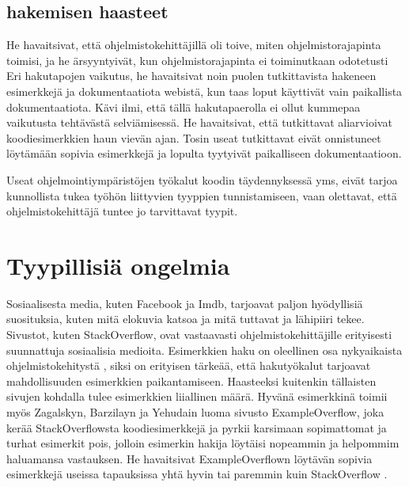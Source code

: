 \documentclass[finnish]{../tktltiki2}
\theoremstyle{definition}
\theoremstyle{remark}
\begin{document}
\subsection{hakemisen haasteet}
He havaitsivat, että ohjelmistokehittäjillä oli toive, miten ohjelmistorajapinta toimisi, ja he ärsyyntyivät, kun ohjelmistorajapinta ei toiminutkaan odotetusti \cite{asking-and-answering-api-questions}
Eri hakutapojen vaikutus, he havaitsivat noin puolen tutkittavista hakeneen esimerkkejä ja dokumentaatiota webistä, kun taas loput käyttivät vain paikallista dokumentaatiota. Kävi ilmi, että tällä hakutapaerolla ei ollut kummepaa vaikutusta tehtävästä selviämisessä. He havaitsivat, että tutkittavat aliarvioivat koodiesimerkkien haun vievän ajan. Tosin useat tutkittavat eivät onnistuneet löytämään sopivia esimerkkejä ja lopulta tyytyivät paikalliseen dokumentaatioon.  \cite{asking-and-answering-api-questions}

Useat ohjelmointiympäristöjen työkalut koodin täydennyksessä yms, eivät tarjoa kunnollista tukea työhön liittyvien tyyppien tunnistamiseen, vaan olettavat, että ohjelmistokehittäjä tuntee jo tarvittavat tyypit.  \cite{asking-and-answering-api-questions}


\section{Tyypillisiä ongelmia}
Sosiaalisesta media, kuten Facebook ja Imdb, tarjoavat paljon hyödyllisiä suosituksia, kuten mitä elokuvia katsoa ja mitä tuttavat ja lähipiiri tekee. Sivustot, kuten StackOverflow, ovat vastaavasti ohjelmistokehittäjille erityisesti suunnattuja sosiaalisia medioita.
Esimerkkien haku on oleellinen osa nykyaikaista ohjelmistokehitystä \cite{example-overflow-social-media-for-code-recommendations}, siksi on erityisen tärkeää, että hakutyökalut tarjoavat mahdollisuuden esimerkkien paikantamiseen.
Haasteeksi kuitenkin tällaisten sivujen kohdalla tulee esimerkkien liiallinen määrä. Hyvänä esimerkkinä toimii myös Zagalskyn, Barzilayn ja Yehudain luoma sivusto ExampleOverflow, joka kerää StackOverflowsta koodiesimerkkejä ja pyrkii karsimaan sopimattomat ja turhat esimerkit pois, jolloin esimerkin hakija löytäisi nopeammin ja helpommim haluamansa vastauksen. He havaitsivat ExampleOverflown löytävän sopivia esimerkkejä useissa tapauksissa yhtä hyvin tai paremmin kuin StackOverflow \cite{example-overflow-social-media-for-code-recommendations}.



\cite{social-networking-meets-se}
\end{document}
